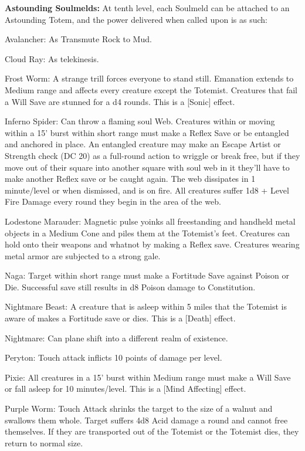 \textbf{Astounding Soulmelds:} At tenth level, each Soulmeld can be attached to an Astounding Totem, and the power delivered when called upon is as such: 
\begin{itemize*}
\item Avalancher: As Transmute Rock to Mud. 
\item Cloud Ray: As telekinesis. 
\item Frost Worm: A strange trill forces everyone to stand still. Emanation extends to Medium range and affects every creature except the Totemist. Creatures that fail a Will Save are stunned for a d4 rounds. This is a [Sonic] effect. 
\item Inferno Spider: Can throw a flaming soul Web. Creatures within or moving within a 15' burst within short range must make a Reflex Save or be entangled and anchored in place. An entangled creature may make an Escape Artist or Strength check (DC 20) as a full-round action to wriggle or break free, but if they move out of their square into another square with soul web in it they'll have to make another Reflex save or be caught again. The web dissipates in 1 minute/level or when dismissed, and is on fire. All creatures suffer 1d8 + Level Fire Damage every round they begin in the area of the web. 
\item Lodestone Marauder: Magnetic pulse yoinks all freestanding and handheld metal objects in a Medium Cone and piles them at the Totemist's feet. Creatures can hold onto their weapons and whatnot by making a Reflex save. Creatures wearing metal armor are subjected to a strong gale. 
\item Naga: Target within short range must make a Fortitude Save against Poison or Die. Successful save still results in d8 Poison damage to Constitution. 
\item Nightmare Beast: A creature that is asleep within 5 miles that the Totemist is aware of makes a Fortitude save or dies. This is a [Death] effect. 
\item Nightmare: Can plane shift into a different realm of existence. 
\item Peryton: Touch attack inflicts 10 points of damage per level. 
\item Pixie: All creatures in a 15' burst within Medium range must make a Will Save or fall asleep for 10 minutes/level. This is a [Mind Affecting] effect. 
\item Purple Worm: Touch Attack shrinks the target to the size of a walnut and swallows them whole. Target suffers 4d8 Acid damage a round and cannot free themselves. If they are transported out of the Totemist or the Totemist dies, they return to normal size. 

\end{itemize*}
